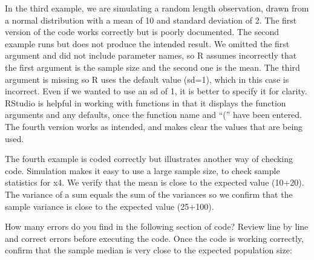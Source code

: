 \documentclass[
]{krantz}
\begin{document}
In the third example, we are simulating a random length observation, drawn from a normal distribution with a mean of 10 and standard deviation of 2. The first version of the code works correctly but is poorly documented. The second example runs but does not produce the intended result. We omitted the first argument and did not include parameter names, so R assumes incorrectly that the first argument is the sample size and the second one is the mean. The third argument is missing so R uses the default value (sd=1), which in this case is incorrect. Even if we wanted to use an sd of 1, it is better to specify it for clarity. RStudio is helpful in working with functions in that it displays the function arguments and any defaults, once the function name and ``('' have been entered. The fourth version works as intended, and makes clear the values that are being used.

The fourth example is coded correctly but illustrates another way of checking code. Simulation makes it easy to use a large sample size, to check sample statistics for x4. We verify that the mean is close to the expected value (10+20). The variance of a sum equals the sum of the variances so we confirm that the sample variance is close to the expected value (25+100).

How many errors do you find in the following section of code? Review line by line and correct errors before executing the code. Once the code is working correctly, confirm that the sample median is very close to the expected population size:
\end{document}
